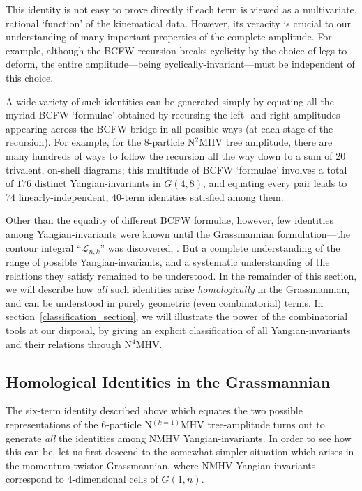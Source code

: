 \documentclass[12pt,hyperref,compress]{JHEP3}
\begin{document}
{This identity is not easy to prove directly if each term is viewed as a multivariate, rational `function' of the kinematical data. However, its veracity is crucial to our understanding of many important properties of the complete amplitude. For example, although the BCFW-recursion breaks cyclicity by the choice of legs to deform, the entire amplitude---being cyclically-invariant---must be independent of this choice.

A wide variety of such identities can be generated simply by equating all the myriad BCFW `formulae' obtained by recursing the left- and right-amplitudes appearing across the BCFW-bridge in all possible ways (at each stage of the recursion). For example, for the $8$-particle N$^2$MHV tree amplitude, there are many hundreds of ways to follow the recursion all the way down to a sum of 20 trivalent, on-shell diagrams; this multitude of BCFW `formulae' involves a total of $176$ distinct Yangian-invariants in $G(4,8)$, and equating every pair leads to 74 linearly-independent, 40-term identities satisfied among them.

Other than the equality of different BCFW formulae, however, few identities among Yangian-invariants were known until the Grassmannian formulation---the contour integral ``$\mathcal{L}_{n,k}$'' was discovered, \cite{ArkaniHamed:2009dn}. But a complete understanding of the range of possible Yangian-invariants, and a systematic understanding of the relations they satisfy remained to be understood. In the remainder of this section, we will describe how {\it all} such identities arise {\it homologically} in the Grassmannian, and can be understood in purely geometric (even combinatorial) terms. In \mbox{section \ref{classification_section}}, we will illustrate the power of the combinatorial tools at our disposal, by giving an explicit classification of  all Yangian-invariants and their relations through N$^4$MHV.

\subsection{Homological Identities in the Grassmannian}\label{homological_identities_subsection}
The six-term identity described above which equates the two possible representations of the $6$-particle N$^{(k=1)}$MHV tree-amplitude turns out to generate {\it all} the identities among NMHV Yangian-invariants. In order to see how this can be, let us first descend to the somewhat simpler situation which arises in the momentum-twistor Grassmannian, where NMHV Yangian-invariants correspond to $4$-dimensional cells of $G(1,n)$.

}
\end{document}
